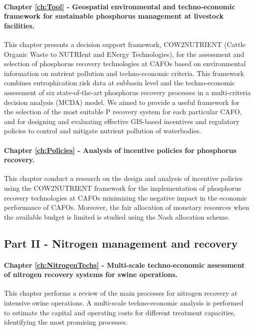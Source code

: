 \begin{refsection}[referencesCh1]
\paragraph{Chapter \ref{ch:Tool} - Geospatial environmental and techno-economic framework for sustainable phosphorus management at livestock facilities.} This chapter presents a decision support framework, COW2NUTRIENT (Cattle Organic Waste to NUTRIent and ENergy Technologies), for the assessment and selection of phosphorus recovery technologies at CAFOs based on environmental information on nutrient pollution and techno-economic criteria. This framework combines eutrophication risk data at subbasin level and the techno-economic assessment of six state-of-the-art phosphorus recovery processes in a multi-criteria decision analysis (MCDA) model. We aimed to provide a useful framework for the selection of the most suitable P recovery system for each particular CAFO, and for designing and evaluating effective GIS-based incentives and regulatory policies to control and mitigate nutrient pollution of waterbodies.

\paragraph{Chapter \ref{ch:Policies} - Analysis of incentive policies for phosphorus recovery.} This chapter conduct a research on the design and analysis of incentive policies using the COW2NUTRIENT framework for the implementation of phosphorus recovery technologies at CAFOs minimizing the negative impact in the economic performance of CAFOs. Moreover, the fair allocation of monetary resources when the available budget is limited is studied using the Nash allocation scheme.

\subsection{Part II - Nitrogen management and recovery}
\paragraph{Chapter \ref{ch:NitrogenTechs} - Multi-scale techno-economic assessment of nitrogen recovery systems for swine operations.} This chapter performs a review of the main processes for nitrogen recovery at intensive swine operations. A multi-scale techno-economic analysis is performed to estimate the capital and operating costs for different treatment capacities, identifying the most promising processes.


\end{refsection}

